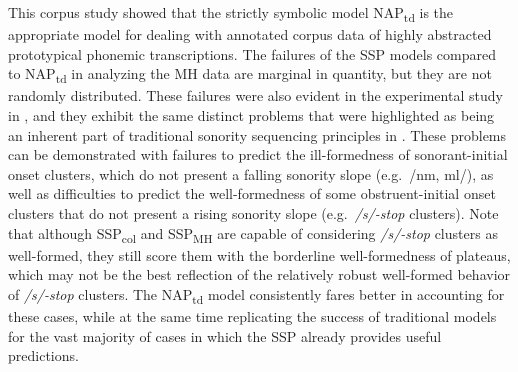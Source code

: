 This corpus study showed that the strictly symbolic model NAP\textsubscript{td} is the appropriate model for dealing with annotated corpus data of highly abstracted prototypical phonemic transcriptions.
The failures of the SSP models compared to NAP\textsubscript{td} in analyzing the MH data are marginal in quantity, but they are not randomly distributed. These failures were also evident in the experimental study in , and they exhibit the same distinct problems that were highlighted as being an inherent part of traditional sonority sequencing principles in .
These problems can be demonstrated with failures to predict the ill-formedness of sonorant-initial onset clusters, which do not present a falling sonority slope (e.g.~/nm, ml/), as well as difficulties to predict the well-formedness of some obstruent-initial onset clusters that do not present a rising sonority slope (e.g.~\emph{/s/-stop} clusters).
Note that although SSP\textsubscript{col} and SSP\textsubscript{MH} are capable of considering \emph{/s/-stop} clusters as well-formed, they still score them with the borderline well-formedness of plateaus, which may not be the best reflection of the relatively robust well-formed behavior of \emph{/s/-stop} clusters.
The NAP\textsubscript{td} model consistently fares better in accounting for these cases, while at the same time replicating the success of traditional models for the vast majority of cases in which the SSP already provides useful predictions.
